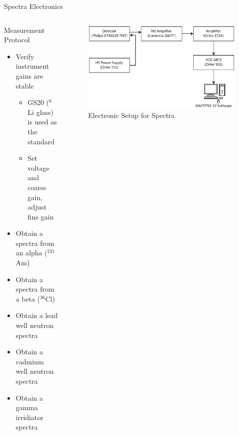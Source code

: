 \begin{frame}{Spectra Electronics}
\begin{columns}[onlytextwidth]
\begin{column}{0.45\textwidth}
	\small 
	Measurement Protocol
	\begin{itemize}
		\tiny
		\item Verify instrument gains are stable
		\begin{itemize}
			\tiny
			\item GS20 (${}^6$Li glass) is used as the standard
			\item Set voltage and coarse gain, adjust fine gain
		\end{itemize}
		\tiny
		\item Obtain a spectra from an alpha (${}^{241}$Am) 
		\item Obtain a spectra from a beta (${}^{36}$Cl)
		\item Obtain a lead well neutron spectra
		\item Obtain a cadmium well neutron spectra
		\item Obtain a gamma irridiator spectra
	\end{itemize}
\end{column}
\begin{column}{0.45\textwidth}
	\begin{figure}
		\centering
		\includegraphics[height=0.5\textwidth]{images/ElectronicsSpectra.eps}
		\caption{Electronic Setup for Spectra}
		\label{fig:ElectronicsSpectra}
	\end{figure}
\end{column}
\end{columns}
\end{frame}
